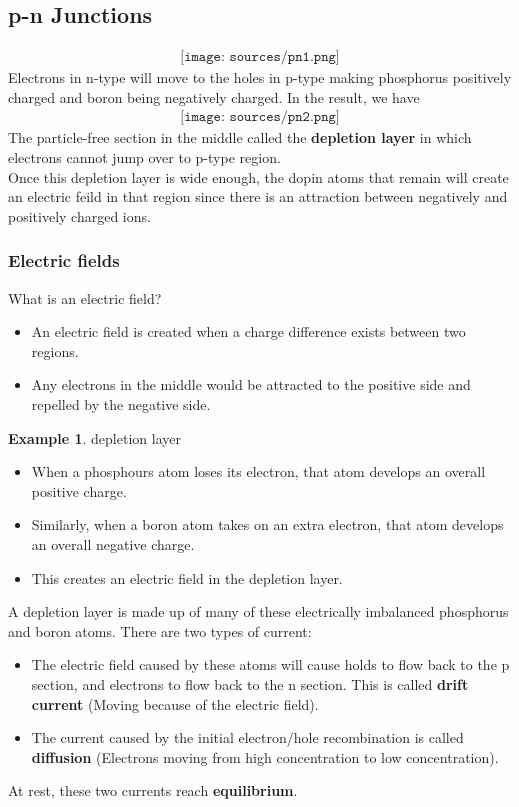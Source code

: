\documentclass[12pt]{article}
\theoremstyle{definition}
\newtheorem{example}{Example}[section]
\begin{document}
\subsection{p-n Junctions}
\begin{align*}
    \texttt{[image: sources/pn1.png]}
\end{align*}
Electrons in n-type will move to the holes in p-type making phosphorus positively charged and boron being negatively charged.
In the result, we have
\begin{align*}
    \texttt{[image: sources/pn2.png]}
\end{align*}
The particle-free section in the middle called the \textbf{depletion layer} in which electrons cannot jump over to p-type region.\\
Once this depletion layer is wide enough, the dopin atoms that remain will create an electric feild in that region since there is an attraction between negatively and positively charged ions.
\subsubsection{Electric fields}
What is an electric field?
\begin{itemize}
    \item An electric field is created when a charge difference exists between two regions.
    \item Any electrons in the middle would be attracted to the positive side and repelled by the negative side.
\end{itemize}
\begin{example}
    depletion layer
    \begin{itemize}
        \item When a phosphours atom loses its electron, that atom develops an overall positive charge.
        \item Similarly, when a boron atom takes on an extra electron, that atom develops an overall negative charge.
        \item This creates an electric field in the depletion layer.
    \end{itemize}
\end{example}
A depletion layer is made up of many of these electrically imbalanced phosphorus and boron atoms.
There are two types of current:
\begin{itemize}
    \item The electric field caused by these atoms will cause holds to flow back to the p section, and electrons to flow back to the n section. This is called \textbf{drift current} (Moving because of the electric field).
    \item The current caused by the initial electron/hole recombination is called \textbf{diffusion} (Electrons moving from high concentration to low concentration).
\end{itemize}
At rest, these two currents reach \textbf{equilibrium}.
\end{document}
